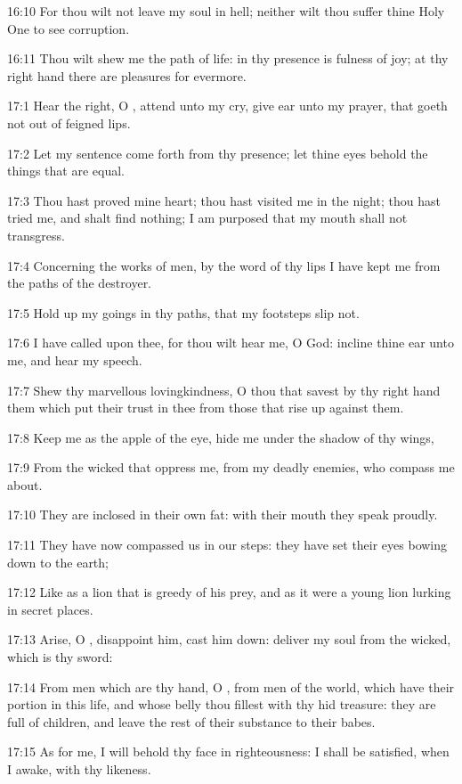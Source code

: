 16:10 For thou wilt not leave my soul in hell; neither wilt thou suffer thine Holy One to see corruption.

16:11 Thou wilt shew me the path of life: in thy presence is fulness of joy; at thy right hand there are pleasures for evermore.



17:1 Hear the right, O \LORD, attend unto my cry, give ear unto my prayer, that goeth not out of feigned lips.

17:2 Let my sentence come forth from thy presence; let thine eyes behold the things that are equal.

17:3 Thou hast proved mine heart; thou hast visited me in the night; thou hast tried me, and shalt find nothing; I am purposed that my mouth shall not transgress.

17:4 Concerning the works of men, by the word of thy lips I have kept me from the paths of the destroyer.

17:5 Hold up my goings in thy paths, that my footsteps slip not.

17:6 I have called upon thee, for thou wilt hear me, O God: incline thine ear unto me, and hear my speech.

17:7 Shew thy marvellous lovingkindness, O thou that savest by thy right hand them which put their trust in thee from those that rise up against them.

17:8 Keep me as the apple of the eye, hide me under the shadow of thy wings,

17:9 From the wicked that oppress me, from my deadly enemies, who compass me about.

17:10 They are inclosed in their own fat: with their mouth they speak proudly.

17:11 They have now compassed us in our steps: they have set their eyes bowing down to the earth;

17:12 Like as a lion that is greedy of his prey, and as it were a young lion lurking in secret places.

17:13 Arise, O \LORD, disappoint him, cast him down: deliver my soul from the wicked, which is thy sword:

17:14 From men which are thy hand, O \LORD, from men of the world, which have their portion in this life, and whose belly thou fillest with thy hid treasure: they are full of children, and leave the rest of their substance to their babes.

17:15 As for me, I will behold thy face in righteousness: I shall be satisfied, when I awake, with thy likeness.




